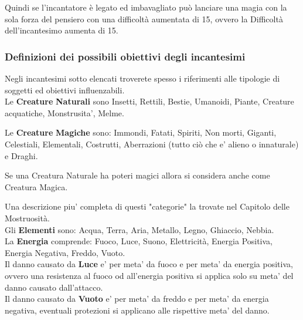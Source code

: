 Quindi se l'incantatore è legato ed imbavagliato può lanciare una magia con la sola forza del pensiero con una difficoltà aumentata di 15, ovvero la Difficoltà dell'incantesimo aumenta di 15.

\subsubsection{Definizioni dei possibili obiettivi degli incantesimi}

Negli incantesimi sotto elencati troverete spesso i riferimenti alle tipologie di soggetti ed obiettivi influenzabili.\\

Le \textbf{Creature} \textbf{Naturali} sono Insetti, Rettili, Bestie, Umanoidi, Piante, Creature acquatiche, Monstrusita', Melme.

Le \textbf{Creature} \textbf{Magiche} sono: Immondi, Fatati, Spiriti, Non morti, Giganti, Celestiali, Elementali, Costrutti, Aberrazioni (tutto ciò che e' alieno o innaturale) e Draghi.

Se una Creatura Naturale ha poteri magici allora si considera anche come Creatura Magica.

Una descrizione piu' completa di questi "categorie" la trovate nel Capitolo delle Mostruosità.\\

Gli \textbf{Elementi} sono: Acqua, Terra, Aria, Metallo, Legno, Ghiaccio, Nebbia.\\
La \textbf{Energia} comprende: Fuoco, Luce, Suono, Elettricità, Energia Positiva, Energia Negativa, Freddo, Vuoto.\\
Il danno causato da \textbf{Luce} e' per meta' da fuoco e per meta' da energia positiva, ovvero una resistenza al fuoco od all'energia positiva si applica solo su meta' del danno causato dall'attacco.\\
Il danno causato da \textbf{Vuoto} e' per meta' da freddo e per meta' da energia negativa, eventuali protezioni si applicano alle rispettive meta' del danno.\\

\pagebreak


